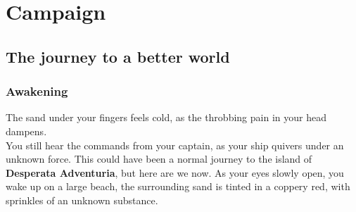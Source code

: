 \chapter{Campaign}
\section{The journey to a better world}

\subsection{Awakening}
The sand under your fingers feels cold, as the throbbing pain in your head dampens. \\You still hear the commands from your captain, as your ship quivers under an unknown force. This could have been a normal journey to the island of \textbf{Desperata Adventuria}, but here are we now. As your eyes slowly open, you wake up on a large beach, the surrounding sand is tinted in a coppery red, with sprinkles of an unknown substance. 
